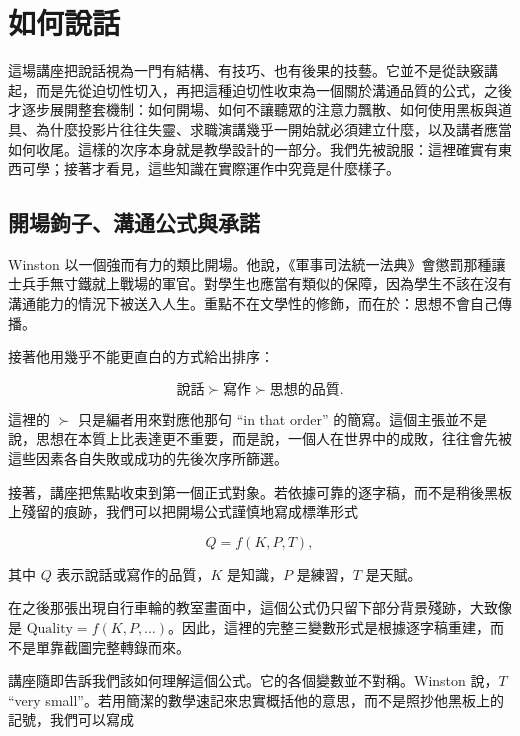 \chapter{如何說話}

這場講座把說話視為一門有結構、有技巧、也有後果的技藝。它並不是從訣竅講起，而是先從迫切性切入，再把這種迫切性收束為一個關於溝通品質的公式，之後才逐步展開整套機制：如何開場、如何不讓聽眾的注意力飄散、如何使用黑板與道具、為什麼投影片往往失靈、求職演講幾乎一開始就必須建立什麼，以及講者應當如何收尾。這樣的次序本身就是教學設計的一部分。我們先被說服：這裡確實有東西可學；接著才看見，這些知識在實際運作中究竟是什麼樣子。

\section{開場鉤子、溝通公式與承諾}

Winston 以一個強而有力的類比開場。他說，《軍事司法統一法典》會懲罰那種讓士兵手無寸鐵就上戰場的軍官。對學生也應當有類似的保障，因為學生不該在沒有溝通能力的情況下被送入人生。重點不在文學性的修飾，而在於：思想不會自己傳播。

接著他用幾乎不能更直白的方式給出排序：

\begin{equation}
\text{說話} \succ \text{寫作} \succ \text{思想的品質}.
\end{equation}

這裡的 \(\succ\) 只是編者用來對應他那句 ``in that order'' 的簡寫。這個主張並不是說，思想在本質上比表達更不重要，而是說，一個人在世界中的成敗，往往會先被這些因素各自失敗或成功的先後次序所篩選。

接著，講座把焦點收束到第一個正式對象。若依據可靠的逐字稿，而不是稍後黑板上殘留的痕跡，我們可以把開場公式謹慎地寫成標準形式

\begin{equation}
Q = f(K,P,T),
\end{equation}

其中 \(Q\) 表示說話或寫作的品質，\(K\) 是知識，\(P\) 是練習，\(T\) 是天賦。

\begin{remark}
在之後那張出現自行車輪的教室畫面中，這個公式仍只留下部分背景殘跡，大致像是 \(\text{Quality}=f(K,P,\ldots)\)。因此，這裡的完整三變數形式是根據逐字稿重建，而不是單靠截圖完整轉錄而來。
\end{remark}

講座隨即告訴我們該如何理解這個公式。它的各個變數並不對稱。Winston 說，\(T\) ``very small''。若用簡潔的數學速記來忠實概括他的意思，而不是照抄他黑板上的記號，我們可以寫成

